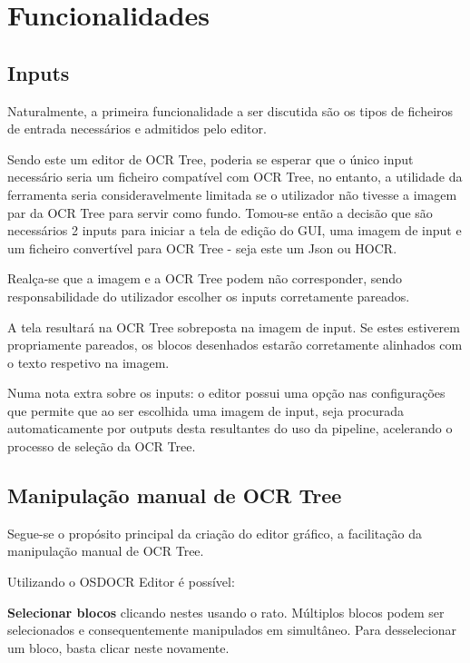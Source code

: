 \section{Funcionalidades}

\subsection{Inputs}

Naturalmente, a primeira funcionalidade a ser discutida são os tipos de ficheiros de entrada necessários e admitidos pelo editor.

Sendo este um editor de OCR Tree, poderia se esperar que o único input necessário seria um ficheiro compatível com OCR Tree, no entanto, a utilidade da ferramenta seria consideravelmente limitada se o utilizador não tivesse a imagem par da OCR Tree para servir como fundo. Tomou-se então a decisão que são necessários 2 inputs para iniciar a tela de edição do GUI, uma imagem de input e um ficheiro convertível para OCR Tree - seja este um Json ou HOCR.

Realça-se que a imagem e a OCR Tree podem não corresponder, sendo responsabilidade do utilizador escolher os inputs corretamente pareados. 

A tela resultará na OCR Tree sobreposta na imagem de input. Se estes estiverem propriamente pareados, os blocos desenhados estarão corretamente alinhados com o texto respetivo na imagem.





Numa nota extra sobre os inputs: o editor possui uma opção nas configurações que permite que ao ser escolhida uma imagem de input, seja procurada automaticamente por outputs desta resultantes do uso da pipeline, acelerando o processo de seleção da OCR Tree.


\subsection{Manipulação manual de OCR Tree}

Segue-se o propósito principal da criação do editor gráfico, a facilitação da manipulação manual de OCR Tree.

Utilizando o OSDOCR Editor é possível:

\textbf{Selecionar blocos} clicando nestes usando o rato. Múltiplos blocos podem ser selecionados e consequentemente manipulados em simultâneo. Para desselecionar um bloco, basta clicar neste novamente.

